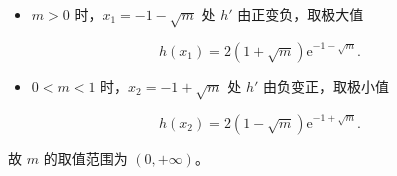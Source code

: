 \begin{answer}
\begin{itemize}
\item $m>0$ 时，$x_1=-1-\sqrt m$ 处 $h'$ 由正变负，取极大值
\end{itemize}

\nopagebreak[4]
\[h(x_1)=2(1+\sqrt m)\mathrm e^{-1-\sqrt m}.\]

\begin{itemize}
\item $0<m<1$ 时，$x_2=-1+\sqrt m$ 处 $h'$ 由负变正，取极小值
\end{itemize}

\nopagebreak[4]
\[h(x_2)=2(1-\sqrt m)\mathrm e^{-1+\sqrt m}.\]

故 $m$ 的取值范围为 $(0,+\infty)$。


\end{answer}
